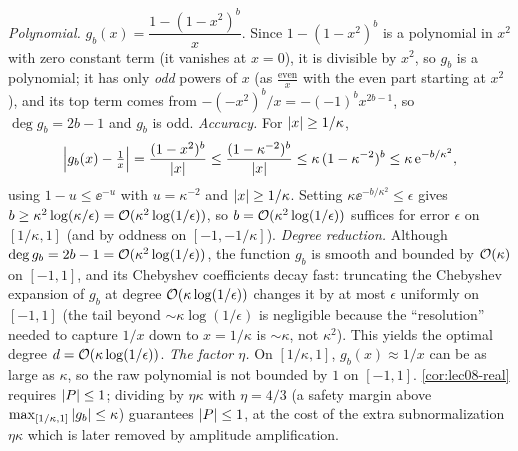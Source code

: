 \begin{solution}
\emph{Polynomial.} $g_b(x)=\dfrac{1-(1-x^2)^b}{x}$. Since $1-(1-x^2)^b$ is a polynomial
in $x^2$ with zero constant term (it vanishes at $x=0$), it is divisible by $x^2$, so
$g_b$ is a polynomial; it has only \emph{odd} powers of $x$ (as $\tfrac{\text{even}}{x}$
with the even part starting at $x^2$), and its top term comes from $-(-x^2)^b/x=
-(-1)^b x^{2b-1}$, so $\deg g_b=2b-1$ and $g_b$ is odd.
\emph{Accuracy.} For $\left\lvert x \right\rvert\ge1/\kappa$,
\[
  \Bigl|g_b(x)-\tfrac1x\Bigr|=\frac{(1-x^2)^b}{\left\lvert x \right\rvert}\le\frac{(1-\kappa^{-2})^b}
  {\left\lvert x \right\rvert}\le\kappa\,(1-\kappa^{-2})^b\le\kappa\,\mathrm{e}^{-b/\kappa^2},
\]
using $1-u\le\ee^{-u}$ with $u=\kappa^{-2}$ and $\left\lvert x \right\rvert\ge1/\kappa$. Setting
$\kappa\ee^{-b/\kappa^2}\le\epsilon$ gives $b\ge\kappa^2\log(\kappa/\epsilon)
=\mathcal{O}(\kappa^2\log(1/\epsilon))$, so $b=\mathcal{O}(\kappa^2\log(1/\epsilon))$ suffices for
error $\epsilon$ on $[1/\kappa,1]$ (and by oddness on $[-1,-1/\kappa]$).
\emph{Degree reduction.} Although $\deg g_b=2b-1=\mathcal{O}(\kappa^2\log(1/\epsilon))$, the
function $g_b$ is smooth and bounded by $\mathcal{O}(\kappa)$ on $[-1,1]$, and its Chebyshev
coefficients decay fast: truncating the Chebyshev expansion of $g_b$ at degree
$\mathcal{O}(\kappa\log(1/\epsilon))$ changes it by at most $\epsilon$ uniformly on $[-1,1]$
(the tail beyond $\sim\kappa\log(1/\epsilon)$ is negligible because the ``resolution''
needed to capture $1/x$ down to $x=1/\kappa$ is $\sim\kappa$, not $\kappa^2$). This
yields the optimal degree $d=\mathcal{O}(\kappa\log(1/\epsilon))$.
\emph{The factor $\eta$.} On $[1/\kappa,1]$, $g_b(x)\approx1/x$ can be as large as
$\kappa$, so the raw polynomial is not bounded by $1$ on $[-1,1]$. \cref{cor:lec08-real}
requires $\left\lvert P \right\rvert\le1$; dividing by $\eta\kappa$ with $\eta=4/3$ (a safety margin above
$\max_{[1/\kappa,1]}\left\lvert g_b \right\rvert\le\kappa$) guarantees $\left\lvert P \right\rvert\le1$, at the cost of the
extra subnormalization $\eta\kappa$ which is later removed by amplitude amplification.
\end{solution}

